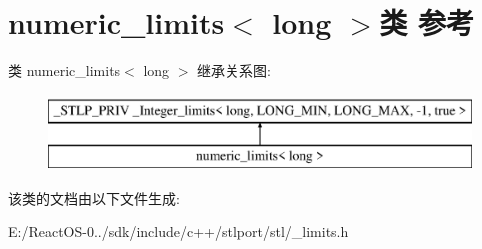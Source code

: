\hypertarget{classnumeric__limits_3_01long_01_4}{}\section{numeric\+\_\+limits$<$ long $>$类 参考}
\label{classnumeric__limits_3_01long_01_4}
类 numeric\+\_\+limits$<$ long $>$ 继承关系图\+:\begin{figure}[H]
\begin{center}
\leavevmode
\includegraphics[height=2.000000cm]{classnumeric__limits_3_01long_01_4}
\end{center}
\end{figure}


该类的文档由以下文件生成\+:\begin{DoxyCompactItemize}
\item 
E\+:/\+React\+O\+S-\/0../sdk/include/c++/stlport/stl/\+\_\+limits.\+h\end{DoxyCompactItemize}
